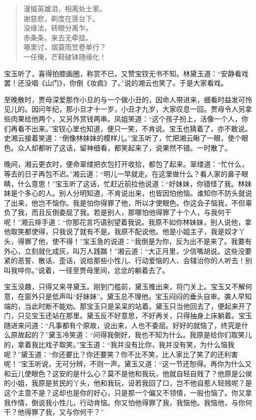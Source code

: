 \documentclass[12pt,oneside]{book}
\newenvironment{shici}{%
\begin{verse}%
\centering\large\hspace{12pt}}%
{\end{verse}}
\begin{document}
\begin{shici}
漫搵英雄泪，相离处士家。\\
谢慈悲，剃度在莲台下。\\
没缘法，转眼分离乍。\\
赤条条，来去无牵挂。\\
哪里讨，烟蓑雨笠卷单行？\\
一任俺，芒鞋破钵随缘化！
\end{shici}

宝玉听了，喜得拍膝画圈，称赏不已，又赞宝钗无书不知。林黛玉道：“安静看戏罢！还没唱《山门》，你倒《妆疯》了。”说的湘云也笑了。于是大家看戏。

至晚散时，贾母深爱那作小旦的与一个做小丑的，因命人带进来，细看时益发可怜见儿的。因问年纪，那小旦才十一岁，小丑才九岁，大家叹息一回。贾母令人另拿些肉果给他两个，又另外赏钱两串。凤姐笑道：“这个孩子扮上，活像一个人，你们再看不出来。”宝钗心里也知道，便只一笑，不肯说。宝玉也猜着了，亦不敢说。史湘云接着笑道：“倒像林妹妹的模样儿。”宝玉听了，忙把湘云瞅了一眼，使个眼色。众人却都听了这话，留神细看，都笑起来了，说果然不错。一时散了。

晚间，湘云更衣时，便命翠缕把衣包打开收拾，都包了起来。翠缕道：“忙什么，等去的日子再包不迟。”湘云道：“明儿一早就走。在这里做什么？看人家的鼻子眼睛，什么意思！”宝玉听了这话，忙赶近前拉他说道：“好妹妹，你错怪了我。林妹妹是个多心的人。别人分明知道，不肯说出来，也皆因怕他恼。谁知你不防头就说了出来，他岂不恼你。我是怕你得罪了他，所以才使眼色。你这会子恼我，不但辜负了我，而且反倒委屈了我。若是别人，那哪怕他得罪了十个人，与我何干呢！”湘云摔手道：“你那花言巧语别望着我说。我原不如你林妹妹，别人说他，拿他取笑都使得，只我说了就有不是。我原不配说他。他是小姐主子，我是奴才丫头，得罪了他，使不得！”宝玉急的说道：“我倒是为你，反为出不是来了。我要有外心，立刻就化成灰，叫万人践踹！”湘云道：“大正月里，少信嘴胡说。这些没要紧的恶誓、散话、歪话，说给那些小性儿、行动爱恼的人、会辖治你的人听去！别叫我啐你。”说着，一径至贾母里间，忿忿的躺着去了。

宝玉没趣，只得又来寻黛玉。刚到门槛前，黛玉推出来，将门关上。宝玉又不解何意，在窗外只是低声叫“好妹妹”。黛玉总不理他。宝玉闷闷的垂头自审。袭人早知端的，当此时断不能劝。那宝玉只是呆呆的站着。黛玉只当他回去了，便起来开了门，只见宝玉还站在那里。黛玉反不好意思，不好再关，只得抽身上床躺着。宝玉随进来问道：“凡事都有个原故，说出来，人也不委屈。好好的就恼了，终究是什么原故起的？”黛玉冷笑道：“问得我倒好，我也不知为什么。我原是给你们取笑儿的，拿着我比戏子取笑。”宝玉道：“我并没有比你，我并没有笑，为什么恼我呢？”黛玉道：“你还要比？你还要笑？你不比不笑，比人家比了笑了的还利害呢！”宝玉听说，无可分辨，不则一声。黛玉又道：“这一节还恕得。再你为什么又和云儿使眼色？这安的是什么心？莫不是他和我玩，他就自轻自贱了？他原是公侯的小姐，我原是贫民的丫头，他和我玩，设若我回了口，岂不他自惹人轻贱呢？是这个主意不是？这却也是你的好心，只是那一个偏又不领情，一般也恼了。你又拿我作情，倒说我小性儿，行动肯恼。你又怕他得罪了我，我恼他。我恼他，与你何干？他得罪了我，又与你何干？”
\end{document}
